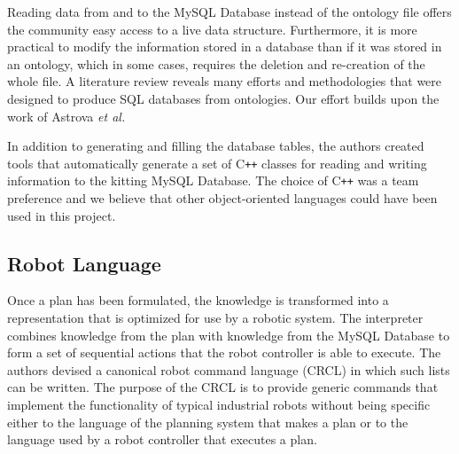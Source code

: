 Reading data from and to the \textsf{MySQL Database} instead of the ontology file offers the community easy access to a live data structure. Furthermore, it is more practical to modify the information stored in a database than if it was stored in an ontology, which in some cases, requires the deletion and re-creation of the whole file. A literature review reveals many efforts and methodologies that were designed to produce SQL databases from ontologies. Our effort builds upon the work of Astrova \textit{et al.} \cite{Astrova2007}

In addition to generating and filling the database tables, the authors created tools that automatically generate a set of C{}\texttt{++} classes for reading and writing
information to the kitting \textsf{MySQL Database}. The choice of C{}\texttt{++} was a team preference and we believe that other object-oriented languages could have been used in this project.

\subsection{Robot Language}
\label{subsection:robot_language}
Once a plan has been formulated, the knowledge is transformed into a representation that is optimized for use by a robotic system. The interpreter combines knowledge from the plan with knowledge from the \textsf{MySQL Database} to form a set of sequential actions that the robot controller is able to execute. The authors devised a canonical robot command language (CRCL) in which such lists can be written. The purpose of the CRCL is to provide generic commands that implement the functionality of typical industrial robots without being specific either to the language of the planning system that makes a plan or to the language used by a robot controller that executes a plan. 